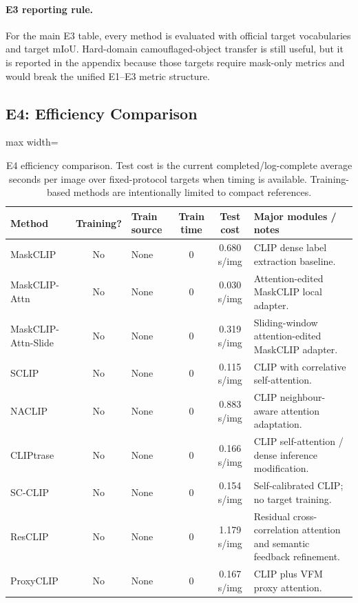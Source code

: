 \documentclass[11pt,a4paper]{article}
\begin{document}
\paragraph{E3 reporting rule.}
For the main E3 table, every method is evaluated with official target vocabularies and target mIoU. Hard-domain camouflaged-object transfer is still useful, but it is reported in the appendix because those targets require mask-only metrics and would break the unified E1--E3 metric structure.

\subsection{E4: Efficiency Comparison}

\begin{table}[H]
\centering
\scriptsize
\caption{E4 efficiency comparison. Test cost is the current completed/log-complete average seconds per image over fixed-protocol targets when timing is available. Training-based methods are intentionally limited to compact references.}
\label{tab:e4-efficiency}
\setlength{\tabcolsep}{3pt}
\begin{adjustbox}{max width=\textwidth}
\begin{tabular}{l c p{} c c p{}}
\toprule
Method & Training? & Train source & Train time & Test cost & Major modules / notes \\
\midrule
MaskCLIP & No & None & 0 & 0.680 s/img & CLIP dense label extraction baseline. \\
MaskCLIP-Attn & No & None & 0 & 0.030 s/img & Attention-edited MaskCLIP local adapter. \\
MaskCLIP-Attn-Slide & No & None & 0 & 0.319 s/img & Sliding-window attention-edited MaskCLIP adapter. \\
SCLIP & No & None & 0 & 0.115 s/img & CLIP with correlative self-attention. \\
NACLIP & No & None & 0 & 0.883 s/img & CLIP neighbour-aware attention adaptation. \\
CLIPtrase & No & None & 0 & 0.166 s/img & CLIP self-attention / dense inference modification. \\
SC-CLIP & No & None & 0 & 0.154 s/img & Self-calibrated CLIP; no target training. \\
ResCLIP & No & None & 0 & 1.179 s/img & Residual cross-correlation attention and semantic feedback refinement. \\
ProxyCLIP & No & None & 0 & 0.167 s/img & CLIP plus VFM proxy attention. \\

\end{tabular}
\end{adjustbox}
\end{table}
\end{document}
